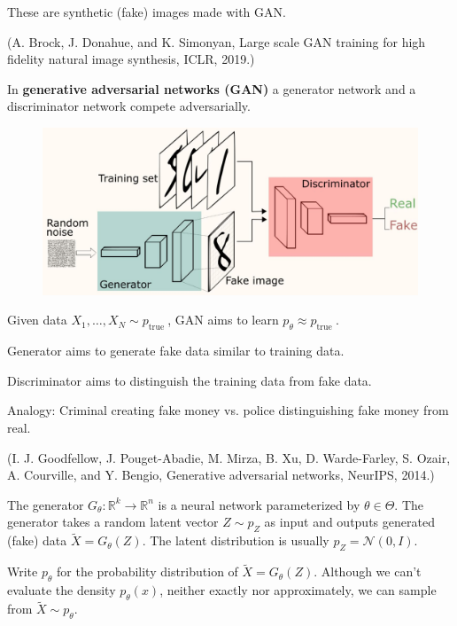 \documentclass{report}
\begin{document}
These are synthetic (fake) images made with GAN.

(A. Brock, J. Donahue, and K. Simonyan, Large scale GAN training for high fidelity natural image synthesis, ICLR, 2019.)

\begin{definition}
    In \textbf{generative adversarial networks (GAN)} a generator network and a discriminator network compete adversarially.

    \begin{figure}[H]
        \centering
        \includegraphics[width=1.0\textwidth]{.././assets/12.2.jpg}
    \end{figure}

    Given data $X_{1}, \ldots, X_{N} \sim p_{\text {true }}$, GAN aims to learn $p_{\theta} \approx p_{\text {true }}$.

    Generator aims to generate fake data similar to training data.

    Discriminator aims to distinguish the training data from fake data.

    Analogy: Criminal creating fake money vs. police distinguishing fake money from real.

    (I. J. Goodfellow, J. Pouget-Abadie, M. Mirza, B. Xu, D. Warde-Farley, S. Ozair, A. Courville, and Y. Bengio, Generative adversarial networks, NeurIPS, 2014.)
\end{definition}

\begin{definition}
    The generator $G_{\theta}: \mathbb{R}^{k} \rightarrow \mathbb{R}^{n}$ is a neural network parameterized by $\theta \in \Theta$. The generator takes a random latent vector $Z \sim p_{Z}$ as input and outputs generated (fake) data $\tilde{X}=G_{\theta}(Z)$. The latent distribution is usually $p_{Z}=\mathcal{N}(0, I)$.

    Write $p_{\theta}$ for the probability distribution of $\tilde{X}=G_{\theta}(Z)$. Although we can't evaluate the density $p_{\theta}(x)$, neither exactly nor approximately, we can sample from $\tilde{X} \sim p_{\theta}$.
\end{definition}
\end{document}
